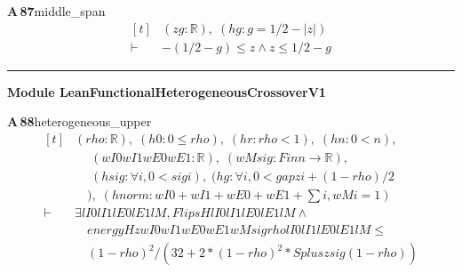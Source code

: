 \documentclass[conference]{IEEEtran}
\theoremstyle{definition}
\newcommand{\lean}[1]{\textsf{\footnotesize #1}}
\begin{document}
\noindent\textbf{A\,87}\quad\lean{middle\_span}
{\footnotesize\[ \begin{aligned}[t]
&(\mathit{z} \mathit{g} : \mathbb{R} ),\; (\mathit{hg} : \mathit{g} = 1/2 - |\mathit{z}|)\\
\vdash\;&-(1/2 - \mathit{g}) \leq \mathit{z} \wedge \mathit{z} \leq 1/2 - \mathit{g}
\end{aligned} \]}

\vspace{4pt}\noindent\rule{\columnwidth}{0.4pt}\par\vspace{2pt}
\noindent\textbf{Module \lean{LeanFunctionalHeterogeneousCrossoverV1}}\par\vspace{3pt}

\noindent\textbf{A\,88}\quad\lean{heterogeneous\_upper}
{\footnotesize\[ \begin{aligned}[t]
&(\mathit{rho} : \mathbb{R} ),\; (\mathit{h0} : 0 \leq \mathit{rho}),\; (\mathit{hr} : \mathit{rho} < 1),\; (\mathit{hn} : 0 < \mathit{n}),\\
&\quad \; (\mathit{wI0} \mathit{wI1} \mathit{wE0} \mathit{wE1} : \mathbb{R} ),\; (\mathit{wM} \mathit{sig} : \mathit{Fin} \mathit{n} \to \mathbb{R} ),\\
&\quad \; (\mathit{hsig} : \forall \mathit{i}, 0 < \mathit{sig} \mathit{i}),\; (\mathit{hg} : \forall \mathit{i}, 0 < \mathit{gap} \mathit{z} \mathit{i} + (1-\mathit{rho})/2\\
&\quad ),\; (\mathit{hnorm} : \mathit{wI0} + \mathit{wI1} + \mathit{wE0} + \mathit{wE1} + \textstyle\sum \mathit{i}, \mathit{wM} \mathit{i} = 1)\\
\vdash\;&\exists \mathit{lI0} \mathit{lI1} \mathit{lE0} \mathit{lE1} \mathit{lM}, \mathit{FlipsH} \mathit{lI0} \mathit{lI1} \mathit{lE0} \mathit{lE1} \mathit{lM} \wedge\\
&\quad \mathit{energyH} \mathit{z} \mathit{wI0} \mathit{wI1} \mathit{wE0} \mathit{wE1} \mathit{wM} \mathit{sig} \mathit{rho} \mathit{lI0} \mathit{lI1} \mathit{lE0} \mathit{lE1} \mathit{lM} \leq\\
&\quad (1-\mathit{rho})^{2}/(32 + 2*(1-\mathit{rho})^{2}*\mathit{Splus} \mathit{z} \mathit{sig} (1-\mathit{rho}))
\end{aligned} \]}
\end{document}
